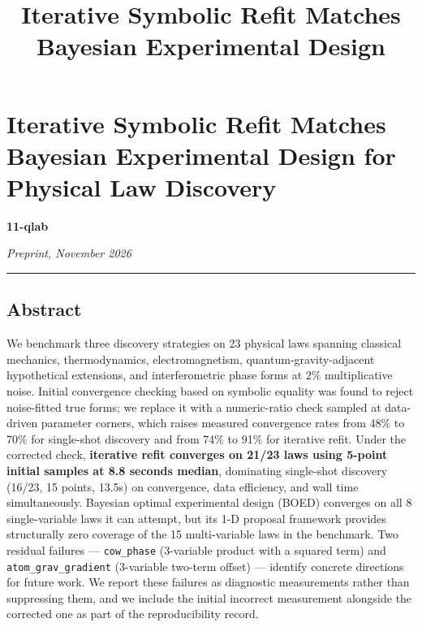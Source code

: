 \documentclass[
]{article}
\title{Iterative Symbolic Refit Matches Bayesian Experimental Design}
\author{}
\date{}
\begin{document}
\maketitle

\section{Iterative Symbolic Refit Matches Bayesian Experimental Design
for Physical Law
Discovery}\label{iterative-symbolic-refit-matches-bayesian-experimental-design-for-physical-law-discovery}

\textbf{11-qlab}

\emph{Preprint, November 2026}

\begin{center}\rule{0.5\linewidth}{0.5pt}\end{center}

\subsection{Abstract}\label{abstract}

We benchmark three discovery strategies on 23 physical laws spanning
classical mechanics, thermodynamics, electromagnetism,
quantum-gravity-adjacent hypothetical extensions, and interferometric
phase forms at 2\% multiplicative noise. Initial convergence checking
based on symbolic equality was found to reject noise-fitted true forms;
we replace it with a numeric-ratio check sampled at data-driven
parameter corners, which raises measured convergence rates from 48\% to
70\% for single-shot discovery and from 74\% to 91\% for iterative
refit. Under the corrected check, \textbf{iterative refit converges on
21/23 laws using 5-point initial samples at 8.8 seconds median},
dominating single-shot discovery (16/23, 15 points, 13.5s) on
convergence, data efficiency, and wall time simultaneously. Bayesian
optimal experimental design (BOED) converges on all 8 single-variable
laws it can attempt, but its 1-D proposal framework provides
structurally zero coverage of the 15 multi-variable laws in the
benchmark. Two residual failures --- \texttt{cow\_phase} (3-variable
product with a squared term) and \texttt{atom\_grav\_gradient}
(3-variable two-term offset) --- identify concrete directions for future
work. We report these failures as diagnostic measurements rather than
suppressing them, and we include the initial incorrect measurement
alongside the corrected one as part of the reproducibility record.
\end{document}
